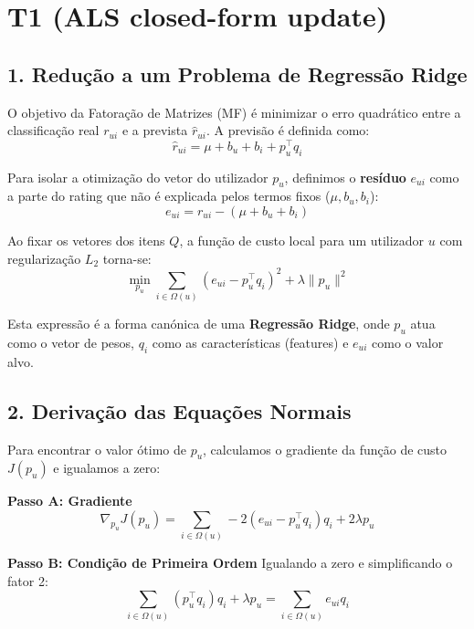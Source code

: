 
\section*{T1 (ALS closed-form update)}

\subsection*{1. Redução a um Problema de Regressão Ridge}

O objetivo da Fatoração de Matrizes (MF) é minimizar o erro quadrático entre a classificação real $r_{ui}$ e a prevista $\hat{r}_{ui}$. A previsão é definida como:
\begin{equation}
\hat{r}_{ui} = \mu + b_u + b_i + p_u^\top q_i
\end{equation}

Para isolar a otimização do vetor do utilizador $p_u$, definimos o \textbf{resíduo} $e_{ui}$ como a parte do rating que não é explicada pelos termos fixos ($\mu, b_u, b_i$):
\begin{equation}
e_{ui} = r_{ui} - (\mu + b_u + b_i)
\end{equation}

Ao fixar os vetores dos itens $Q$, a função de custo local para um utilizador $u$ com regularização $L_2$ torna-se:
\begin{equation}
\min_{p_u} \sum_{i \in \Omega(u)} (e_{ui} - p_u^\top q_i)^2 + \lambda \|p_u\|^2
\end{equation}

Esta expressão é a forma canónica de uma \textbf{Regressão Ridge}, onde $p_u$ atua como o vetor de pesos, $q_i$ como as características (features) e $e_{ui}$ como o valor alvo.

\subsection*{2. Derivação das Equações Normais}

Para encontrar o valor ótimo de $p_u$, calculamos o gradiente da função de custo $J(p_u)$ e igualamos a zero:

\textbf{Passo A: Gradiente}
\begin{equation}
\nabla_{p_u} J(p_u) = \sum_{i \in \Omega(u)} -2(e_{ui} - p_u^\top q_i)q_i + 2\lambda p_u
\end{equation}

\textbf{Passo B: Condição de Primeira Ordem}
Igualando a zero e simplificando o fator 2:
\begin{equation}
\sum_{i \in \Omega(u)} (p_u^\top q_i)q_i + \lambda p_u = \sum_{i \in \Omega(u)} e_{ui} q_i
\end{equation}

